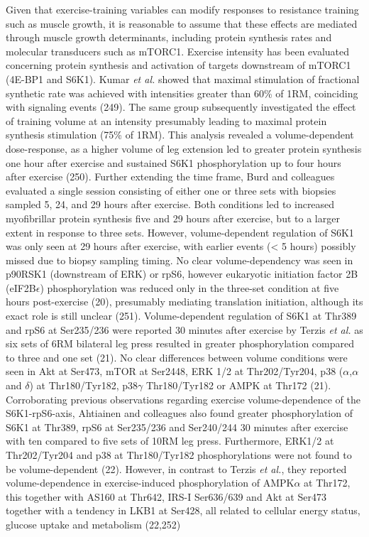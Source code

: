 \documentclass[twoside,10pt]{gihclass} %
\begin{document}
Given that exercise-training variables can modify responses to resistance training such as muscle growth, it is reasonable to assume that these effects are mediated through muscle growth determinants, including protein synthesis rates and molecular transducers such as mTORC1.
Exercise intensity has been evaluated concerning protein synthesis and activation of targets downstream of mTORC1 (4E-BP1 and S6K1).
Kumar \emph{et al.} showed that maximal stimulation of fractional synthetic rate was achieved with intensities greater than 60\% of 1RM, coinciding with signaling events
(249).
The same group subsequently investigated the effect of training volume at an intensity presumably leading to maximal protein synthesis stimulation (75\% of 1RM).
This analysis revealed a volume-dependent dose-response, as a higher volume of leg extension led to greater protein synthesis one hour after exercise and sustained S6K1 phosphorylation up to four hours after exercise
(250).
Further extending the time frame, Burd and colleagues evaluated a single session consisting of either one or three sets with biopsies sampled 5, 24, and 29 hours after exercise. Both conditions led to increased myofibrillar protein synthesis five and 29 hours after exercise, but to a larger extent in response to three sets.
However, volume-dependent regulation of S6K1 was only seen at 29 hours after exercise, with earlier events (\textless{} 5 hours) possibly missed due to biopsy sampling timing.
No clear volume-dependency was seen in p90RSK1 (downstream of ERK) or rpS6, however eukaryotic initiation factor 2B (eIF2B\(\epsilon\)) phosphorylation was reduced only in the three-set condition at five hours post-exercise (20), presumably mediating translation initiation, although its exact role is still unclear
(251).
Volume-dependent regulation of S6K1 at Thr389 and rpS6 at Ser235/236 were reported 30 minutes after exercise by Terzis \emph{et al.} as six sets of 6RM bilateral leg press resulted in greater phosphorylation compared to three and one set
(21).
No clear differences between volume conditions were seen in Akt at Ser473, mTOR at Ser2448, ERK 1/2 at Thr202/Tyr204, p38 (\(\alpha\),\(\alpha\) and \(\delta\)) at Thr180/Tyr182, p38\(\gamma\) Thr180/Tyr182 or AMPK at Thr172
(21).
Corroborating previous observations regarding exercise volume-dependence of the S6K1-rpS6-axis, Ahtiainen and colleagues also found greater phosphorylation of S6K1 at Thr389, rpS6 at Ser235/236 and Ser240/244 30 minutes after exercise with ten compared to five sets of 10RM leg press.
Furthermore, ERK1/2 at Thr202/Tyr204 and p38 at Thr180/Tyr182 phosphorylations were not found to be volume-dependent
(22).
However, in contrast to Terzis \emph{et al.}, they reported volume-dependence in exercise-induced phosphorylation of AMPK\(\alpha\) at Thr172, this together with AS160 at Thr642, IRS-I Ser636/639 and Akt at Ser473 together with a tendency in LKB1 at Ser428, all related to cellular energy status, glucose uptake and metabolism
(22,252)
\end{document}

